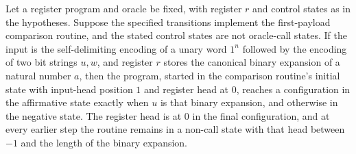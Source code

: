 \begin{lemma}
\label{Complexity.LogProg.jeqPairFst_run}
\leanok
{}
Let a register program and oracle be fixed, with register $r$ and control states as in
the hypotheses. Suppose the specified transitions implement the first-payload comparison
routine, and the stated control states are not oracle-call states. If the input is the
self-delimiting encoding of a unary word $1^n$ followed by the encoding of two bit
strings $u,w$, and register $r$ stores the canonical binary expansion of a natural
number $a$, then the program, started in the comparison routine's initial state with
input-head position $1$ and register head at $0$, reaches a configuration in the
affirmative state exactly when $u$ is that binary expansion, and otherwise in the
negative state. The register head is at $0$ in the final configuration, and at every
earlier step the routine remains in a non-call state with that head between $-1$ and the
length of the binary expansion.
\end{lemma}

